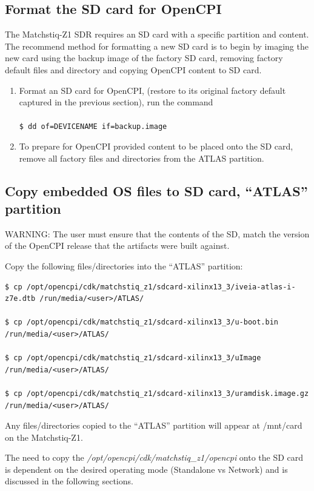 \subsection{Format the SD card for OpenCPI}
The Matchstiq-Z1 SDR requires an SD card with a
specific partition and content. The recommend method for formatting a new SD card is to begin by imaging the new card using the backup image of the factory SD card, removing factory default files and directory and copying OpenCPI content to SD card.
\begin{enumerate}
	\item Format an SD card for OpenCPI, (restore to its original factory default captured in the previous section), run the command \\ \\
	\texttt{\$ dd of=DEVICENAME if=backup.image}
	\item To prepare for OpenCPI provided content to be placed onto the SD card, remove all factory files and directories from the ATLAS partition.
\end{enumerate}

\subsection{Copy embedded OS files to SD card, ``ATLAS'' partition}
\label{sec:Copy embedded OS to SD card}
\begin{flushleft}

WARNING: The user must ensure that the contents of the SD, match the version of the OpenCPI release that the artifacts were built against.\\ \medskip

Copy the following files/directories into the ``ATLAS'' partition:
\begin{verbatim}
$ cp /opt/opencpi/cdk/matchstiq_z1/sdcard-xilinx13_3/iveia-atlas-i-z7e.dtb /run/media/<user>/ATLAS/

$ cp /opt/opencpi/cdk/matchstiq_z1/sdcard-xilinx13_3/u-boot.bin /run/media/<user>/ATLAS/

$ cp /opt/opencpi/cdk/matchstiq_z1/sdcard-xilinx13_3/uImage /run/media/<user>/ATLAS/

$ cp /opt/opencpi/cdk/matchstiq_z1/sdcard-xilinx13_3/uramdisk.image.gz /run/media/<user>/ATLAS/
\end{verbatim}

Any files/directories copied to the ``ATLAS'' partition will appear at /mnt/card on the Matchstiq-Z1.\\ \medskip

The need to copy the \textit{/opt/opencpi/cdk/matchstiq\_z1/opencpi} onto the SD card is dependent on the desired operating mode (Standalone vs Network) and is discussed in the following sections.
\end{flushleft}

